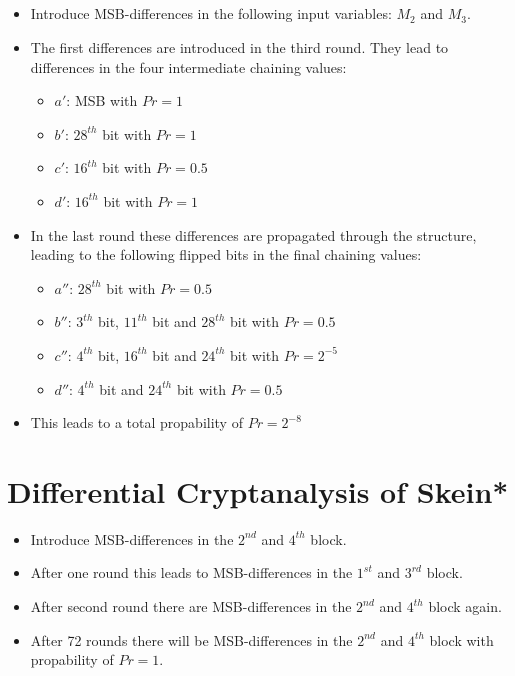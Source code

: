 \subsection{}

\begin{itemize}
    \item Introduce MSB-differences in the following input variables: $M_2$ and $M_3$.
    \item The first differences are introduced in the third round. They lead to differences in the four intermediate chaining values:
    \begin{itemize}
        \item $a'$: MSB with $Pr = 1$
        \item $b'$: $28^{th}$ bit with $Pr = 1$
        \item $c'$: $16^{th}$ bit with $Pr = 0.5$
        \item $d'$: $16^{th}$ bit with $Pr = 1$
    \end{itemize}
    \item In the last round these differences are propagated through the structure, leading to the following flipped bits in the final chaining values:
    \begin{itemize}
        \item $a''$: $28^{th}$ bit with $Pr = 0.5$
        \item $b''$: $3^{th}$ bit, $11^{th}$ bit and $28^{th}$ bit with $Pr = 0.5$
        \item $c''$: $4^{th}$ bit, $16^{th}$ bit and $24^{th}$ bit with $Pr = 2^{-5}$
        \item $d''$: $4^{th}$ bit and $24^{th}$ bit with $Pr = 0.5$
    \end{itemize}
    \item This leads to a total propability of $Pr = 2^{-8}$
\end{itemize}

\section{Differential Cryptanalysis of Skein*}

\begin{itemize}
    \item Introduce MSB-differences in the $2^{nd}$ and $4^{th}$ block.
    \item After one round this leads to MSB-differences in the $1^{st}$ and $3^{rd}$ block.
    \item After second round there are MSB-differences in the $2^{nd}$ and $4^{th}$ block again.
    \item After 72 rounds there will be MSB-differences in the $2^{nd}$ and $4^{th}$ block with propability of $Pr = 1$.
\end{itemize}

